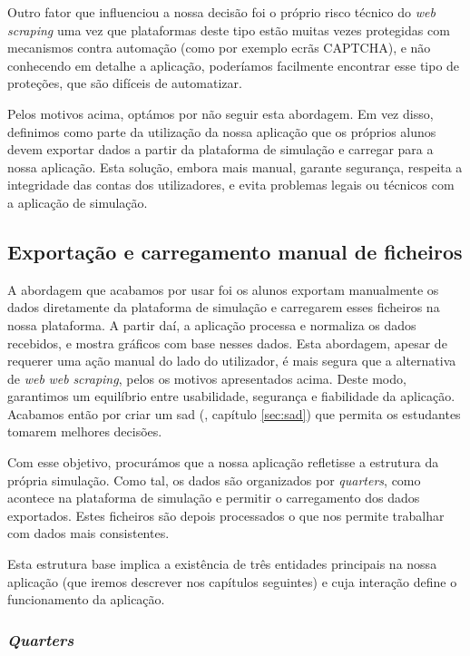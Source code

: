 Outro fator que influenciou a nossa decisão foi o próprio risco técnico do \textit{web} \textit{scraping} uma vez que plataformas deste tipo estão muitas vezes protegidas com mecanismos contra automação (como por exemplo ecrãs CAPTCHA), e não conhecendo em detalhe a aplicação, poderíamos facilmente encontrar esse tipo de proteções, que são difíceis de automatizar.

Pelos motivos acima, optámos por não seguir esta abordagem. Em vez disso, definimos como parte da utilização da nossa aplicação que os próprios alunos devem exportar dados a partir da plataforma de simulação e carregar para a nossa aplicação. Esta solução, embora mais manual, garante segurança, respeita a integridade das contas dos utilizadores, e evita problemas legais ou técnicos com a aplicação de simulação.

\subsection{Exportação e carregamento manual de ficheiros}

A abordagem que acabamos por usar foi os alunos exportam manualmente os dados diretamente da plataforma de simulação e carregarem esses ficheiros na nossa plataforma. A partir daí, a aplicação processa e normaliza os dados recebidos, e mostra gráficos com base nesses dados. Esta abordagem, apesar de requerer uma ação manual do lado do utilizador, é mais segura que a alternativa de \textit{web} \textit{web} \textit{scraping}, pelos os motivos apresentados acima. Deste modo, garantimos um equilíbrio entre usabilidade, segurança e fiabilidade da aplicação. Acabamos então por criar um \gls{sad} (\cf, capítulo \ref{sec:sad}) que permita os estudantes tomarem melhores decisões.

Com esse objetivo, procurámos que a nossa aplicação refletisse a estrutura da própria simulação. Como tal, os dados são organizados por \textit{quarters}, como acontece na plataforma de simulação e permitir o carregamento dos dados exportados. Estes ficheiros são depois processados o que nos permite trabalhar com dados mais consistentes. 

Esta estrutura base implica a existência de três entidades principais na nossa aplicação (que iremos descrever nos capítulos seguintes) e cuja interação define  o funcionamento da aplicação.

\subsubsection{\textit{Quarters}}

